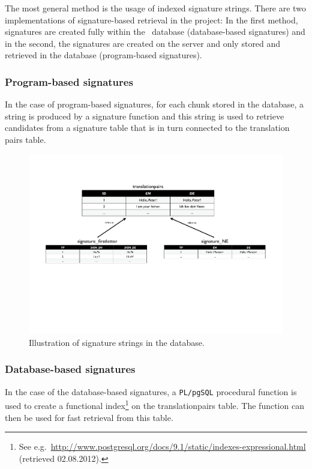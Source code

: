 The most general method is the usage of indexed signature strings. There are two implementations of signature-based retrieval in the project: In the first method, signatures are created fully within the \postgres~database (database-based signatures) and in the second, the signatures are created on the server and only stored and retrieved in the
database (program-based signatures).  


\subsubsection*{Program-based signatures}

In the case of program-based signatures, for each chunk stored in the database, a string is produced by a signature function and this string is used to retrieve candidates from a signature table that is in turn
connected to the translation pairs table.

\begin{figure}[h!]
	\centering
		\includegraphics[width=17cm]{figures/core/signatures.pdf}
	\caption{Illustration of signature strings in the database.}
	\label{fig:figures_core_signatures}
\end{figure}


\subsubsection*{Database-based signatures}

In the case of the database-based signatures, a {\tt PL/pgSQL} procedural function is used to create a functional index\footnote{See e.g.\ \url{http://www.postgresql.org/docs/9.1/static/indexes-expressional.html} (retrieved 02.08.2012).} on the translationpairs table. The function can then be used for fast retrieval from this table.



